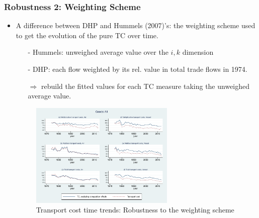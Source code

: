 \documentclass[10 pt,Helvetica, french]{beamer}
\begin{document}
\begin{frame}[label = robustness2]
\frametitle{Robustness 2: Weighting Scheme}
\begin{itemize}
\item A difference between DHP and Hummels (2007)'s: the weighting scheme used to get the evolution of the pure TC over time.
\begin{itemize}
\item[-]Hummels: unweighed average value over the $i,k$ dimension\vspace{0.1cm}
\item[-]DHP: each flow weighted by its rel. value in total trade flows in 1974.
\pause
\item[$\Rightarrow$]rebuild the fitted values for each TC measure taking the unweighed average value.
 \end{itemize}

\begin{figure}[htbp]
\small{\caption{Transport cost time trends: Robustness to the weighting scheme}}
\label{fig:compeffects_robustness}
\begin{center}
\includegraphics[height=5cm]
{graph_composition_all_np.pdf}
\end{center}
\end{figure}
   \end{itemize}

\end{frame}

\end{document}
